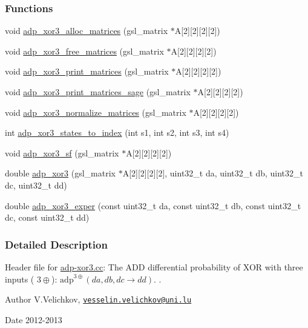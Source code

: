 \subsubsection*{\-Functions}
\begin{DoxyCompactItemize}
\item 
void \hyperlink{adp-xor3_8hh_a74f6e7378f7e6c853acc038410039f4a}{adp\-\_\-xor3\-\_\-alloc\-\_\-matrices} (gsl\-\_\-matrix $\ast$\-A\mbox{[}2\mbox{]}\mbox{[}2\mbox{]}\mbox{[}2\mbox{]}\mbox{[}2\mbox{]})
\item 
void \hyperlink{adp-xor3_8hh_abf05505e86f5bb3298cc0ebea3f0dd06}{adp\-\_\-xor3\-\_\-free\-\_\-matrices} (gsl\-\_\-matrix $\ast$\-A\mbox{[}2\mbox{]}\mbox{[}2\mbox{]}\mbox{[}2\mbox{]}\mbox{[}2\mbox{]})
\item 
void \hyperlink{adp-xor3_8hh_aac86169eeb2495e0c44b856b5c6b11b5}{adp\-\_\-xor3\-\_\-print\-\_\-matrices} (gsl\-\_\-matrix $\ast$\-A\mbox{[}2\mbox{]}\mbox{[}2\mbox{]}\mbox{[}2\mbox{]}\mbox{[}2\mbox{]})
\item 
void \hyperlink{adp-xor3_8hh_ad4022d70aae8155141f5f845bee103fc}{adp\-\_\-xor3\-\_\-print\-\_\-matrices\-\_\-sage} (gsl\-\_\-matrix $\ast$\-A\mbox{[}2\mbox{]}\mbox{[}2\mbox{]}\mbox{[}2\mbox{]}\mbox{[}2\mbox{]})
\item 
void \hyperlink{adp-xor3_8hh_a2e47c316522917ac1c7e1de1ae6b214a}{adp\-\_\-xor3\-\_\-normalize\-\_\-matrices} (gsl\-\_\-matrix $\ast$\-A\mbox{[}2\mbox{]}\mbox{[}2\mbox{]}\mbox{[}2\mbox{]}\mbox{[}2\mbox{]})
\item 
int \hyperlink{adp-xor3_8hh_acb00f7be212378d2c43e9a3dd7db71ef}{adp\-\_\-xor3\-\_\-states\-\_\-to\-\_\-index} (int s1, int s2, int s3, int s4)
\item 
void \hyperlink{adp-xor3_8hh_a229a19749624926d15eb5b1731379855}{adp\-\_\-xor3\-\_\-sf} (gsl\-\_\-matrix $\ast$\-A\mbox{[}2\mbox{]}\mbox{[}2\mbox{]}\mbox{[}2\mbox{]}\mbox{[}2\mbox{]})
\item 
double \hyperlink{adp-xor3_8hh_a980a22f6faf155e031f0d9f7e8ca9361}{adp\-\_\-xor3} (gsl\-\_\-matrix $\ast$\-A\mbox{[}2\mbox{]}\mbox{[}2\mbox{]}\mbox{[}2\mbox{]}\mbox{[}2\mbox{]}, uint32\-\_\-t da, uint32\-\_\-t db, uint32\-\_\-t dc, uint32\-\_\-t dd)
\item 
double \hyperlink{adp-xor3_8hh_aafab7c51890d39cedee9a09d2c1629dd}{adp\-\_\-xor3\-\_\-exper} (const uint32\-\_\-t da, const uint32\-\_\-t db, const uint32\-\_\-t dc, const uint32\-\_\-t dd)
\end{DoxyCompactItemize}


\subsubsection{\-Detailed \-Description}
\-Header file for \hyperlink{adp-xor3_8cc}{adp-\/xor3.\-cc}\-: \-The \-A\-D\-D differential probability of \-X\-O\-R with three inputs ( $3\oplus$)\-: $\mathrm{adp}^{3\oplus}(da,db,dc \rightarrow dd)$. . \begin{DoxyAuthor}{\-Author}
\-V.\-Velichkov, \href{mailto:vesselin.velichkov@uni.lu}{\tt vesselin.\-velichkov@uni.\-lu} 
\end{DoxyAuthor}
\begin{DoxyDate}{\-Date}
2012-\/2013 
\end{DoxyDate}


